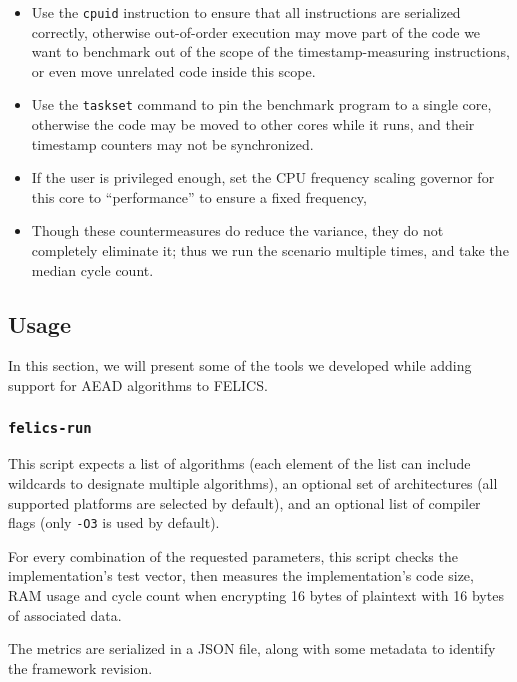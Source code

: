 \documentclass{article}
\begin{document}
\begin{itemize}
\item Use the \texttt{cpuid} instruction to ensure that all
  instructions are serialized correctly, otherwise out-of-order
  execution may move part of the code we want to benchmark out of the
  scope of the timestamp-measuring instructions, or even move
  unrelated code inside this scope.

\item Use the \texttt{taskset} command to pin the benchmark program to
  a single core, otherwise the code may be moved to other cores while
  it runs, and their timestamp counters may not be synchronized.

\item If the user is privileged enough, set the CPU frequency scaling
  governor for this core to ``performance'' to ensure a fixed
  frequency,

\item Though these countermeasures do reduce the variance, they do not
  completely eliminate it; thus we run the scenario multiple times,
  and take the median cycle count.
\end{itemize}

\subsection{Usage}
\label{sec:felics-ae/usage}

In this section, we will present some of the tools we developed while
adding support for AEAD algorithms to FELICS.

\subsubsection{\texttt{felics-run}}

This script expects a list of algorithms (each element of the list can
include wildcards to designate multiple algorithms), an optional set
of architectures (all supported platforms are selected by default),
and an optional list of compiler flags (only \texttt{-O3} is used by
default).

For every combination of the requested parameters, this script checks
the implementation's test vector, then measures the implementation's
code size, RAM usage and cycle count when encrypting 16 bytes of
plaintext with 16 bytes of associated data.

The metrics are serialized in a JSON file, along with some metadata to
identify the framework revision.
\end{document}
